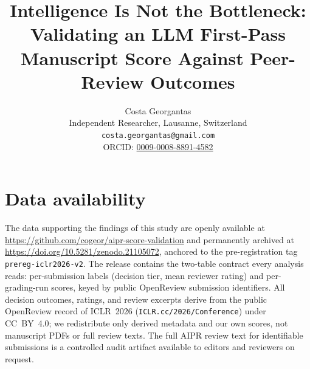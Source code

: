 \documentclass[11pt]{article}
\title{\textbf{Intelligence Is Not the Bottleneck:\\
Validating an LLM First-Pass Manuscript Score Against Peer-Review Outcomes}}
\author{%
  Costa Georgantas\\
  Independent Researcher, Lausanne, Switzerland\\
  \texttt{\small costa.georgantas@gmail.com}\\
  ORCID: \href{https://orcid.org/0009-0008-8891-4582}{0009-0008-8891-4582}%
}
\date{}
\begin{document}
\maketitle









\section*{Data availability}
The data supporting the findings of this study are openly available at
\url{https://github.com/cogeor/aipr-score-validation} and permanently archived at
\url{https://doi.org/10.5281/zenodo.21105072}, anchored to the pre-registration tag
\texttt{prereg-iclr2026-v2}. The release contains the two-table contract every analysis
reads: per-submission labels (decision tier, mean reviewer rating) and per-grading-run
scores, keyed by public OpenReview submission identifiers. All decision outcomes, ratings,
and review excerpts derive from the public OpenReview record of ICLR~2026
(\texttt{ICLR.cc/2026/Conference}) under CC~BY~4.0; we redistribute only derived metadata and
our own scores, not manuscript PDFs or full review texts. The full AIPR review text for
identifiable submissions is a controlled audit artifact available to editors and reviewers on
request.
\end{document}
